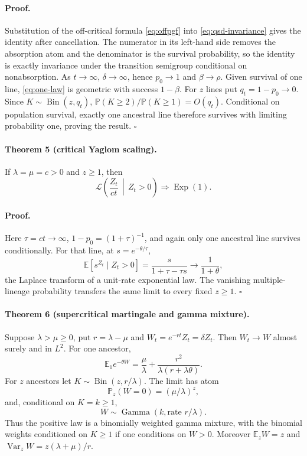 \documentclass[9pt]{extarticle}
\newcommand{\Exp}{\operatorname{Exp}}
\newcommand{\GammaLaw}{\operatorname{Gamma}}
\newcommand{\Bin}{\operatorname{Bin}}
\begin{document}
\paragraph{Proof.}
Substitution of the off-critical formula \eqref{eq:offpgf} into
\eqref{eq:qsd-invariance} gives the identity after cancellation.  The
numerator in its left-hand side removes the absorption atom and the
denominator is the survival probability, so the identity is exactly
invariance under the transition semigroup conditional on nonabsorption.
As $t\to\infty$, $\delta\to\infty$, hence $p_0\to1$ and
$\beta\to\rho$.  Given survival of one line, \eqref{eq:one-law} is geometric
with success $1-\beta$.  For $z$ lines put $q_t=1-p_0\to0$.
Since $K\sim\Bin(z,q_t)$,
$\mathbb P(K\geq2)/\mathbb P(K\geq1)=O(q_t)$.  Conditional on population
survival, exactly one ancestral line therefore survives with limiting
probability one, proving the result. \hfill$\square$

\paragraph{Theorem 5 (critical Yaglom scaling).}
If $\lambda=\mu=c>0$ and $z\geq1$, then
\[
 \mathcal L\left(\frac{Z_t}{ct}\,\middle|\,Z_t>0\right)
 \Longrightarrow \Exp(1).
\]

\paragraph{Proof.}
Here $\tau=ct\to\infty$, $1-p_0=(1+\tau)^{-1}$, and again only one ancestral
line survives conditionally.  For that line, at $s=e^{-\theta/\tau}$,
\[
 \mathbb E[s^{Z_t}\mid Z_t>0]
 =\frac{s}{1+\tau-\tau s}\longrightarrow\frac1{1+\theta},
\]
the Laplace transform of a unit-rate exponential law.  The vanishing
multiple-lineage probability transfers the same limit to every fixed
$z\geq1$. \hfill$\square$

\paragraph{Theorem 6 (supercritical martingale and gamma mixture).}
Suppose $\lambda>\mu\geq0$, put $r=\lambda-\mu$ and
$W_t=e^{-rt}Z_t=\delta Z_t$.  Then $W_t\to W$ almost surely and in $L^2$.
For one ancestor,
\begin{equation}\label{eq:super-laplace}
 \mathbb E_1e^{-\theta W}
 =\frac\mu\lambda+
 \frac{r^2}{\lambda(r+\lambda\theta)}.
\end{equation}
For $z$ ancestors let $K\sim\Bin(z,r/\lambda)$.  The limit has atom
\[
 \mathbb P_z(W=0)=(\mu/\lambda)^z,
\]
and, conditional on $K=k\geq1$,
\[
 W\sim\GammaLaw\!\left(k,\text{rate }r/\lambda\right).
\]
Thus the positive law is a binomially weighted gamma mixture, with the
binomial weights conditioned on $K\geq1$ if one conditions on $W>0$.
Moreover $\mathbb E_zW=z$ and
$\operatorname{Var}_zW=z(\lambda+\mu)/r$.
\end{document}

